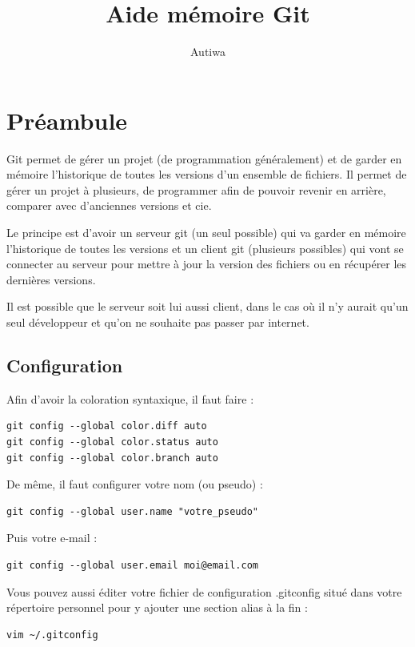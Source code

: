 \documentclass[a4paper,twoside]{article}
\title{Aide mémoire Git}
\author{Autiwa}
\begin{document}

\cleardoublepage

\tableofcontents

\cleardoublepage

\section{Préambule}
Git permet de gérer un projet (de programmation généralement) et de garder en mémoire l'historique de toutes les versions d'un ensemble de fichiers. Il permet de gérer un projet à plusieurs, de programmer afin de pouvoir revenir en arrière, comparer avec d'anciennes versions et cie. 

Le principe est d'avoir un serveur git (un seul possible) qui va garder en mémoire l'historique de toutes les versions et un client git (plusieurs possibles) qui vont se connecter au serveur pour mettre à jour la version des fichiers ou en récupérer les dernières versions.

\begin{remarque}
Il est possible que le serveur soit lui aussi client, dans le cas où il n'y aurait qu'un seul développeur et qu'on ne souhaite pas passer par internet.
\end{remarque}

\subsection{Configuration}
Afin d'avoir la coloration syntaxique, il faut faire : 
\begin{verbatim}
git config --global color.diff auto
git config --global color.status auto
git config --global color.branch auto
\end{verbatim}

De même, il faut configurer votre nom (ou pseudo) :
\begin{verbatim}
git config --global user.name "votre_pseudo"
\end{verbatim}


Puis votre e-mail :
\begin{verbatim}
git config --global user.email moi@email.com
\end{verbatim}


Vous pouvez aussi éditer votre fichier de configuration .gitconfig situé dans votre répertoire personnel pour y ajouter une section alias à la fin :
\begin{verbatim}
vim ~/.gitconfig
\end{verbatim}
\end{document}
